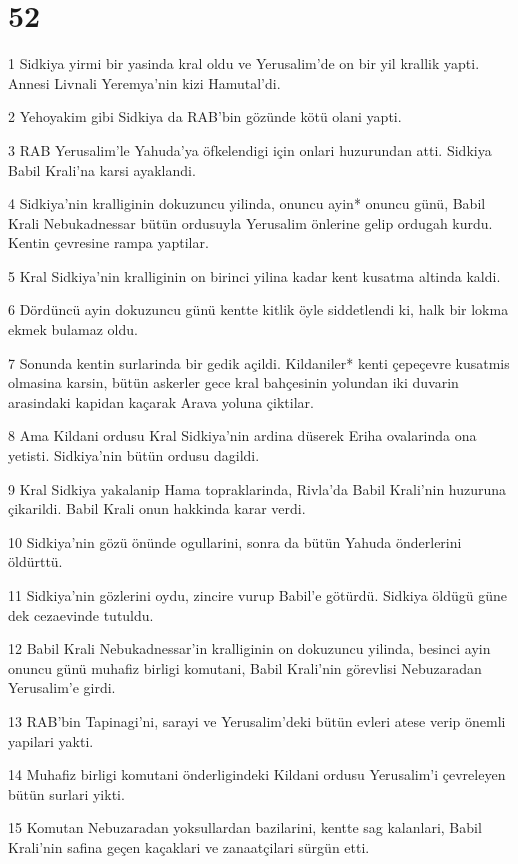 \chapter{52}

\par 1 Sidkiya yirmi bir yasinda kral oldu ve Yerusalim'de on bir yil krallik yapti. Annesi Livnali Yeremya'nin kizi Hamutal'di.
\par 2 Yehoyakim gibi Sidkiya da RAB'bin gözünde kötü olani yapti.
\par 3 RAB Yerusalim'le Yahuda'ya öfkelendigi için onlari huzurundan atti. Sidkiya Babil Krali'na karsi ayaklandi.
\par 4 Sidkiya'nin kralliginin dokuzuncu yilinda, onuncu ayin* onuncu günü, Babil Krali Nebukadnessar bütün ordusuyla Yerusalim önlerine gelip ordugah kurdu. Kentin çevresine rampa yaptilar.
\par 5 Kral Sidkiya'nin kralliginin on birinci yilina kadar kent kusatma altinda kaldi.
\par 6 Dördüncü ayin dokuzuncu günü kentte kitlik öyle siddetlendi ki, halk bir lokma ekmek bulamaz oldu.
\par 7 Sonunda kentin surlarinda bir gedik açildi. Kildaniler* kenti çepeçevre kusatmis olmasina karsin, bütün askerler gece kral bahçesinin yolundan iki duvarin arasindaki kapidan kaçarak Arava yoluna çiktilar.
\par 8 Ama Kildani ordusu Kral Sidkiya'nin ardina düserek Eriha ovalarinda ona yetisti. Sidkiya'nin bütün ordusu dagildi.
\par 9 Kral Sidkiya yakalanip Hama topraklarinda, Rivla'da Babil Krali'nin huzuruna çikarildi. Babil Krali onun hakkinda karar verdi.
\par 10 Sidkiya'nin gözü önünde ogullarini, sonra da bütün Yahuda önderlerini öldürttü.
\par 11 Sidkiya'nin gözlerini oydu, zincire vurup Babil'e götürdü. Sidkiya öldügü güne dek cezaevinde tutuldu.
\par 12 Babil Krali Nebukadnessar'in kralliginin on dokuzuncu yilinda, besinci ayin onuncu günü muhafiz birligi komutani, Babil Krali'nin görevlisi Nebuzaradan Yerusalim'e girdi.
\par 13 RAB'bin Tapinagi'ni, sarayi ve Yerusalim'deki bütün evleri atese verip önemli yapilari yakti.
\par 14 Muhafiz birligi komutani önderligindeki Kildani ordusu Yerusalim'i çevreleyen bütün surlari yikti.
\par 15 Komutan Nebuzaradan yoksullardan bazilarini, kentte sag kalanlari, Babil Krali'nin safina geçen kaçaklari ve zanaatçilari sürgün etti.
